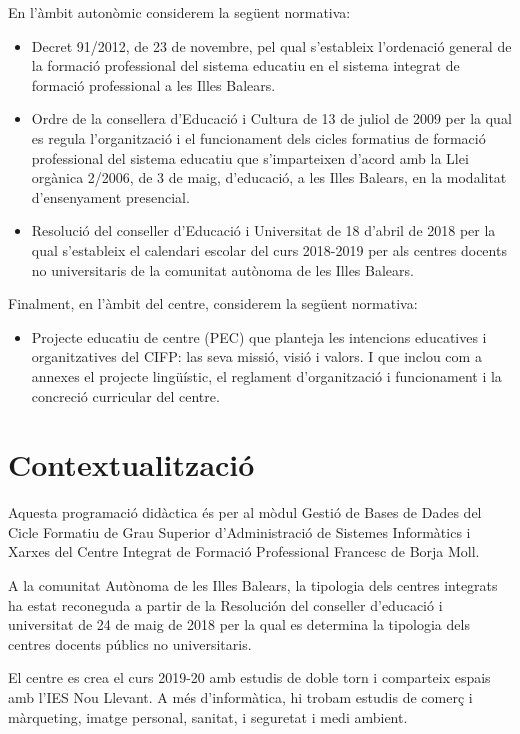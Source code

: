 \documentclass[catalan, a4paper, 12pt, titlepage]{article}
\begin{document}
En l'àmbit autonòmic considerem la següent normativa:
\begin{itemize}
	\item Decret 91/2012, de 23 de novembre, pel qual s'estableix l'ordenació general de la formació professional del sistema educatiu en el sistema integrat de formació professional a les Illes Balears.
	\item Ordre de la consellera d'Educació i Cultura de 13 de juliol de 2009 per la qual es regula l'organització i el funcionament dels cicles formatius de formació professional del sistema educatiu que s'imparteixen d'acord amb la Llei orgànica 2/2006, de 3 de maig, d'educació, a les Illes Balears, en la modalitat d'ensenyament presencial.
	\item Resolució del conseller d'Educació i Universitat de 18 d'abril de 2018 per la qual s'estableix el calendari escolar del curs 2018-2019 per als centres docents no universitaris de la comunitat autònoma de les Illes Balears.
\end{itemize}

Finalment, en l'àmbit del centre, considerem la següent normativa:
\begin{itemize}
	\item Projecte educatiu de centre (PEC) que planteja les intencions educatives i organitzatives del CIFP: las seva missió, visió i valors. I que inclou com a annexes el projecte lingüístic, el reglament d'organització i funcionament i la concreció curricular del centre.
\end{itemize}

\section{Contextualització}

Aquesta programació didàctica és per al mòdul Gestió de Bases de Dades del Cicle Formatiu de Grau Superior d'Administració de Sistemes Informàtics i Xarxes del Centre Integrat de Formació Professional Francesc de Borja Moll. 

A la comunitat Autònoma de les Illes Balears, la tipologia dels centres integrats ha estat reconeguda a partir de la Resolución del conseller d'educació i universitat de 24 de maig de 2018 per la qual es determina la tipologia dels centres docents públics no universitaris.

El centre es crea el curs 2019-20 amb estudis de doble torn i comparteix espais amb l'IES Nou Llevant. A més d'informàtica, hi trobam estudis de comerç i màrqueting, imatge personal, sanitat, i seguretat i medi ambient.
\end{document}
